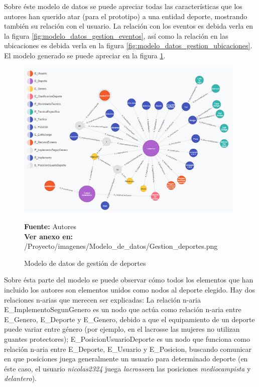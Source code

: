 Sobre éste modelo de datos se puede apreciar todas las características que los autores han querido atar (para el prototipo) a una entidad deporte, mostrando también su relación con el usuario. La relación con los eventos es debida verla en la figura \ref{fig:modelo_datos_gestion_eventos}, así como la relación en las ubicaciones es debida verla en la figura \ref{fig:modelo_datos_gestion_ubicaciones}. El modelo generado se puede apreciar en la figura \ref{fig:modelo_datos_gestion_deportes}.

\begin{figure}[!htb]
  \begin{center}
    \includegraphics[width=11cm]{./imagenes/Modelo_de_datos/Gestion_deportes.png}
    \caption{Modelo de datos de gestión de deportes}
    \label{fig:modelo_datos_gestion_deportes}
    \textbf{Fuente:}  Autores \\
    \textbf{Ver anexo en:} /Proyecto/imagenes/Modelo\_de\_datos/Gestion\_deportes.png
  \end{center}
\end{figure}

Sobre ésta parte del modelo se puede observar cómo todos los elementos que han incluido los autores son elementos unidos como nodos al deporte elegido. Hay dos relaciones n-arias que merecen ser explicadas: La relación n-aria E\_ImplementoSegunGenero es un nodo que actúa como relación n-aria entre E\_Genero, E\_Deporte y E\_Genero, debido a que el equipamiento de un deporte puede variar entre género (por ejemplo, en el lacrosse las mujeres no utilizan guantes protectores); E\_PosicionUsuarioDeporte es un nodo que funciona como relación n-aria entre E\_Deporte, E\_Usuario y E\_Posicion, buscando comunicar en que posiciones juega generalmente un usuario para determinado deporte (en éste caso, el usuario \textit{nicolas2324} juega \textit{lacrosse}en las posiciones \textit{mediocampista} y \textit{delantero}).

